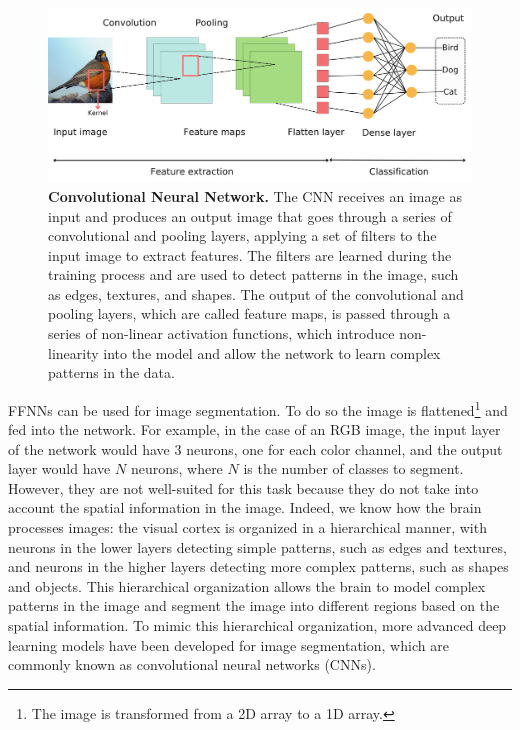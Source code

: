 \begin{figure}[H]
  \centering
  \includegraphics[width=1\textwidth]{Figures/CNN.pdf}
  \caption[Convolutional Neural Network]{
    \textbf{Convolutional Neural Network.} The CNN receives an image as input
    and produces an output image that goes through a series of convolutional
    and pooling layers, applying a set of filters to the input image to
    extract features. The filters are learned during the training process and
    are used to detect patterns in the image, such as edges, textures, and
    shapes. The output of the convolutional and pooling layers, which are
    called feature maps, is passed through a series of non-linear activation
    functions, which introduce non-linearity into the model and allow the
    network to learn complex patterns in the data.}
  \label{fig:CNN_scheme}
\end{figure}

FFNNs can be used for image segmentation. To do so the image is
flattened\footnote{The image is transformed from a 2D array to a 1D array.}
and fed into the network. For example, in the case of an RGB image, the input
layer of the network would have 3 neurons, one for each color channel, and the
output layer would have $N$ neurons, where $N$ is the number of classes to
segment. However, they are not well-suited for this task because they do not
take into account the spatial information in the image. Indeed, we know how the
brain processes images: the visual cortex is organized in a hierarchical
manner, with neurons in the lower layers detecting simple patterns, such as
edges and textures, and neurons in the higher layers detecting more complex
patterns, such as shapes and objects. This hierarchical organization allows the
brain to model complex patterns in the image and segment the image into
different regions based on the spatial information. To mimic this hierarchical
organization, more advanced deep learning models have been developed for image
segmentation, which are commonly known as convolutional neural networks (CNNs).

